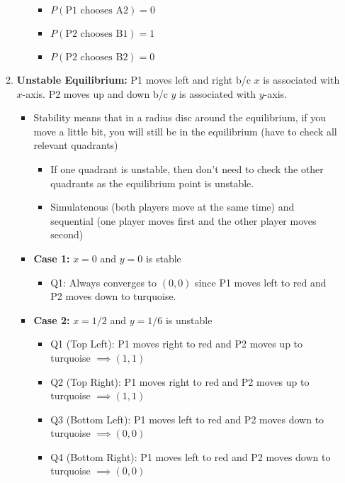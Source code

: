 \begin{example}
\begin{enumerate}
\begin{enumerate}
\begin{itemize}
\begin{itemize}
                    \item $P(\text{P1 chooses A2}) = 0$
                    \item $P(\text{P2 chooses B1}) = 1$
                    \item $P(\text{P2 chooses B2}) = 0$
                \end{itemize}
            \end{itemize}
            \item \textbf{Unstable Equilibrium:} P1 moves left and right b/c $x$ is associated with $x$-axis. P2 moves up and down b/c $y$ is associated with $y$-axis.
            \begin{itemize}
                \item Stability means that in a radius disc around the equilibrium, if you move a little bit, you will still be in the equilibrium (have to check all relevant quadrants)
                \begin{itemize}
                    \item If one quadrant is unstable, then don't need to check the other quadrants as the equilibrium point is unstable. 
                    \item Simulatenous (both players move at the same time) and sequential (one player moves first and the other player moves second) 
                \end{itemize}
                \item \textbf{Case 1:} $x=0$ and $y=0$ is stable
                \begin{itemize}
                    \item Q1: Always converges to $(0,0)$ since P1 moves left to red and P2 moves down to turquoise.
                \end{itemize}
                \item \textbf{Case 2:} $x=1/2$ and $y=1/6$ is unstable
                \begin{itemize}
                    \item Q1 (Top Left): P1 moves right to red and P2 moves up to turquoise $\implies (1,1)$
                    \item Q2 (Top Right): P1 moves right to red and P2 moves up to turquoise $\implies (1,1)$
                    \item Q3 (Bottom Left): P1 moves left to red and P2 moves down to turquoise $\implies (0,0)$
                    \item Q4 (Bottom Right): P1 moves left to red and P2 moves down to turquoise $\implies (0,0)$

\end{itemize}
\end{itemize}
\end{enumerate}
\end{enumerate}
\end{example}
